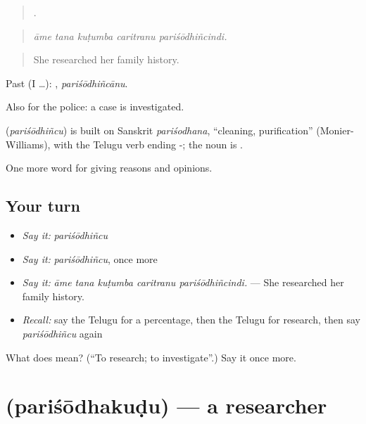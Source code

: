 \begin{quote}
    .
\end{quote}

\begin{quote}
\emph{āme tana kuṭumba caritranu pariśōdhiñcindi.}
\end{quote}

\begin{quote}
She researched her family history.
\end{quote}

Past (I …): , \emph{pariśōdhiñcānu}.

Also for the police: a case is investigated.

\begin{cousinweb}
\textbf{} (\emph{pariśōdhiñcu}) is built on Sanskrit \emph{pariśodhana}, \textquotedblleft{}cleaning, purification\textquotedblright{} (Monier-Williams), with the Telugu verb ending -; the noun is .
\end{cousinweb}

\begin{grammarlens}[title={What you've built}]
One more word for giving reasons and opinions.
\end{grammarlens}

\subsection*{Your turn}
\begin{itemize}
\raggedright
  \item \emph{Say it:} \emph{pariśōdhiñcu}
  \item \emph{Say it:} \emph{pariśōdhiñcu}, once more
  \item \emph{Say it:} \emph{āme tana kuṭumba caritranu pariśōdhiñcindi.} — She researched her family history.
  \item \emph{Recall:} say the Telugu for a percentage, then the Telugu for research, then say \emph{pariśōdhiñcu} again
\end{itemize}

\begin{tcolorbox}[breakable,colback=teal!4,colframe=teal!35!black,title={Before you move on}]
What does  mean? (\textquotedblleft{}To research; to investigate\textquotedblright{}.) Say it once more.
\end{tcolorbox}
\section[\texorpdfstring{\te{పరిశోధకుడు} (pariśōdhakuḍu)}{పరిశోధకుడు (pariśōdhakuḍu)}]{ (pariśōdhakuḍu) — a researcher}

